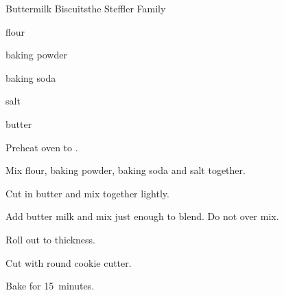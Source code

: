 \begin{recipe}{Buttermilk Biscuits}{the Steffler Family}{}

\begin{ingredients}
\item {} flour
\item {} baking powder
\item \tp{\half} baking soda
\item \tp{\half} salt
\item \tp{\half} butter
\item {} 
\end{ingredients}

\begin{directions}
\item Preheat oven to .
\item Mix flour, baking powder, baking soda and salt together.
\item Cut in butter and mix together lightly.
\item Add butter milk and mix just enough to blend. Do not over mix.
\item Roll out to  thickness.
\item Cut with round cookie cutter.
\item Bake for 15~minutes.
\end{directions}

\end{recipe}
